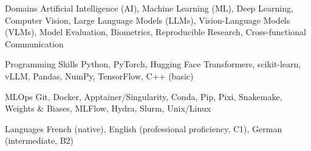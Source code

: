 

\begin{cvskills}

  \cvskill
    {Domains} %
    {Artificial Intelligence (AI), Machine Learning (ML), Deep Learning, Computer Vision, Large Language Models (LLMs), Vision-Language Models (VLMs), Model Evaluation, Biometrics, Reproducible Research, Cross-functional Communication} %

  \cvskill
    {Programming Skills} %
    {Python, PyTorch, Hugging Face Transformers, scikit-learn, vLLM, Pandas, NumPy, TensorFlow, C++ (basic)} %

  \cvskill
    {MLOps} %
    {Git, Docker, Apptainer/Singularity, Conda, Pip, Pixi, Snakemake, Weights \& Biases, MLFlow, Hydra, Slurm, Unix/Linux} %

  \cvskill
    {Languages} %
    {French (native), English (professional proficiency, C1), German (intermediate, B2)} %

\end{cvskills}
